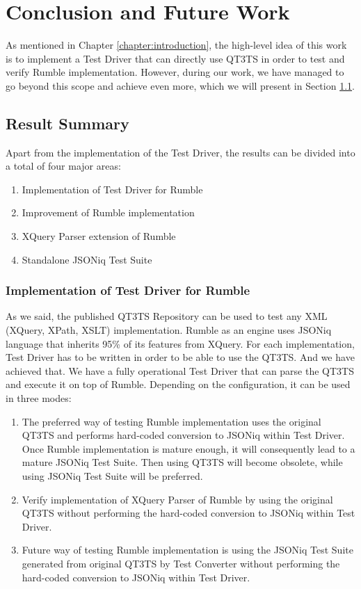 \chapter{Conclusion and Future Work} 
\label{chapter:conclusions}
As mentioned in Chapter \ref{chapter:introduction}, the high-level idea of this work is to implement a Test Driver that can directly use QT3TS in order to test and verify Rumble implementation. However, during our work, we have managed to go beyond this scope and achieve even more, which we will present in Section \ref{sec:overallsummary}.

\section{Result Summary}
\label{sec:overallsummary}
Apart from the implementation of the Test Driver, the results can be divided into a total of four major areas:
\begin{enumerate}
	\item Implementation of Test Driver for Rumble
	\item Improvement of Rumble implementation
	\item XQuery Parser extension of Rumble
	\item Standalone JSONiq Test Suite
\end{enumerate}

\subsection{Implementation of Test Driver for Rumble}
As we said, the published QT3TS Repository \cite{TestSuiteGitHubRepository} can be used to test any XML (XQuery, XPath, XSLT) implementation. Rumble as an engine uses JSONiq language that inherits 95\% of its features from XQuery. For each implementation, Test Driver has to be written in order to be able to use the QT3TS. And we have achieved that. We have a fully operational Test Driver that can parse the QT3TS and execute it on top of Rumble. Depending on the configuration, it can be used in three modes:
\begin{enumerate}
	\item The preferred way of testing Rumble implementation uses the original QT3TS and performs hard-coded conversion to JSONiq within Test Driver. Once Rumble implementation is mature enough, it will consequently lead to a mature JSONiq Test Suite. Then using QT3TS will become obsolete, while using JSONiq Test Suite will be preferred.
	\item  Verify implementation of XQuery Parser of Rumble by using the original QT3TS without performing the hard-coded conversion to JSONiq within Test Driver.
	\item Future way of testing Rumble implementation is using the JSONiq Test Suite generated from original QT3TS by Test Converter without performing the hard-coded conversion to JSONiq within Test Driver.
\end{enumerate} 

